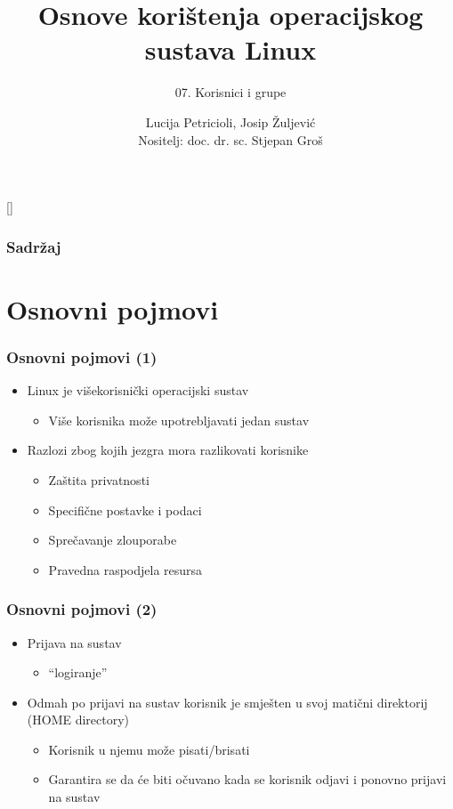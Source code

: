 \documentclass[table,usenames,dvipsnames] {beamer}
\title{Osnove korištenja operacijskog sustava Linux}
\subtitle{07. Korisnici i grupe}
\author[Lucija Petricioli, Josip Žuljević]{Lucija Petricioli, Josip Žuljević\\{\small Nositelj: doc. dr. sc. Stjepan Groš}}
\institute[FER]{Sveučilište u Zagrebu \\
				Fakultet elektrotehnike i računarstva}
\date{\todayiso}
\begin{document}
{
[] %

\begin{frame}
\maketitle
\end{frame}
}

\begin{frame}
\frametitle{Sadržaj}
\tableofcontents
\end{frame}

\section{Osnovni pojmovi}
\begin{frame}[t]
\frametitle{Osnovni pojmovi (1)}
\begin{itemize}
  \item Linux je višekorisnički operacijski sustav
  \begin{itemize}
    \item Više korisnika može upotrebljavati jedan sustav
  \end{itemize}
  \item Razlozi zbog kojih jezgra mora razlikovati korisnike
  \begin{itemize}
    \item Zaštita privatnosti
    \item Specifične postavke i podaci
    \item Sprečavanje zlouporabe
    \item Pravedna raspodjela resursa
  \end{itemize}
\end{itemize}
\end{frame}

\begin{frame}[t]
\frametitle{Osnovni pojmovi (2)}
\begin{itemize}
  \item Prijava na sustav
  \begin{itemize}
    \item ``logiranje''
  \end{itemize}
  \item Odmah po prijavi na sustav korisnik je smješten u svoj matični 
        direktorij (HOME directory)
  \begin{itemize}
    \item Korisnik u njemu može pisati/brisati
    \item Garantira se da će biti očuvano kada se korisnik odjavi i 
          ponovno prijavi na sustav
  \end{itemize}
\end{itemize}
\end{frame}
\end{document}
